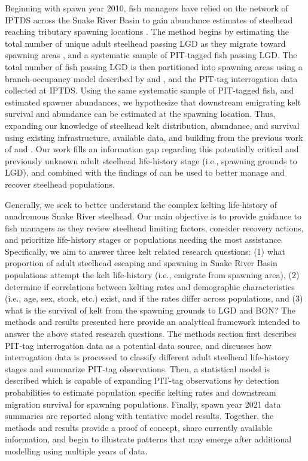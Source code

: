 \documentclass[11pt,a4paper,]{article}
\begin{document}
Beginning with spawn year 2010, fish managers have relied on the network of IPTDS across the Snake River Basin to gain abundance estimates of steelhead reaching tributary spawning locations \autocite{seePITTagBased2016,kinzerREPORTNOAAFISHERIES2020}. The method begins by estimating the total number of unique adult steelhead passing LGD as they migrate toward spawning areas \autocite{seeStateSpaceModelEstimate2021}, and a systematic sample of PIT-tagged fish passing LGD. The total number of fish passing LGD is then partitioned into spawning areas using a branch-occupancy model described by \textcite{seePITTagBased2016} and \textcite{waterhouseBayesianNestedPatch2020}, and the PIT-tag interrogation data collected at IPTDS. Using the same systematic sample of PIT-tagged fish, and estimated spawner abundances, we hypothesize that downstream emigrating kelt survival and abundance can be estimated at the spawning location. Thus, expanding our knowledge of steelhead kelt distribution, abundance, and survival using existing infrastructure, available data, and building from the previous work of \textcite{seePITTagBased2016} and \textcite{seeStateSpaceModelEstimate2021}. Our work fills an information gap regarding this potentially critical and previously unknown adult steelhead life-history stage (i.e., spawning grounds to LGD), and combined with the findings of \textcite{copelandPatternsIteroparityWild2019} can be used to better manage and recover steelhead populations.

Generally, we seek to better understand the complex kelting life-history of anadromous Snake River steelhead. Our main objective is to provide guidance to fish managers as they review steelhead limiting factors, consider recovery actions, and prioritize life-history stages or populations needing the most assistance. Specifically, we aim to answer three kelt related research questions: (1) what proportion of adult steelhead escaping and spawning in Snake River Basin populations attempt the kelt life-history (i.e., emigrate from spawning area), (2) determine if correlations between kelting rates and demographic characteristics (i.e., age, sex, stock, etc.) exist, and if the rates differ across populations, and (3) what is the survival of kelt from the spawning grounds to LGD and BON? The methods and results presented here provide an analytical framework intended to answer the above stated research questions. The methods section first describes PIT-tag interrogation data as a potential data source, and discusses how interrogation data is processed to classify different adult steelhead life-history stages and summarize PIT-tag observations. Then, a statistical model is described which is capable of expanding PIT-tag observations by detection probabilities to estimate population specific kelting rates and downstream migration survival for spawning populations. Finally, spawn year 2021 data summaries are reported along with tentative model results. Together, the methods and results provide a proof of concept, share currently available information, and begin to illustrate patterns that may emerge after additional modelling using multiple years of data.
\end{document}
